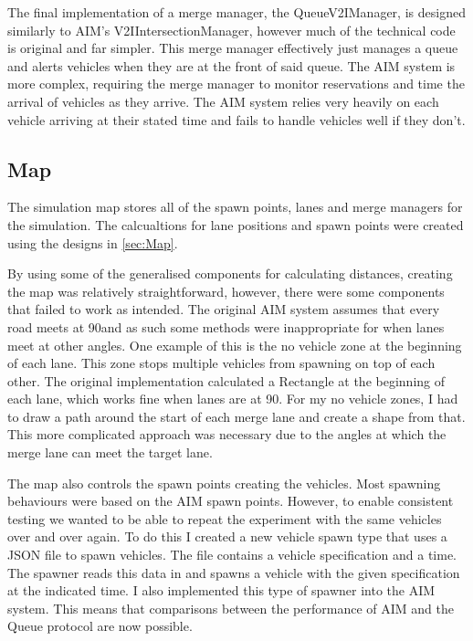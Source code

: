 The final implementation of a merge manager, the QueueV2IManager, is designed similarly to AIM's V2IIntersectionManager, however much of the technical code is original and far simpler. This merge manager effectively just manages a queue and alerts vehicles when they are at the front of said queue. The AIM system is more complex, requiring the merge manager to monitor reservations and time the arrival of vehicles as they arrive. The AIM system relies very heavily on each vehicle arriving at their stated time and fails to handle vehicles well if they don't.

\subsection{Map}
\label{subsec:Map}
The simulation map stores all of the spawn points, lanes and merge managers for the simulation. The calcualtions for lane positions and spawn points were created using the designs in \ref{sec:Map}. 

By using some of the generalised components for calculating distances, creating the map was relatively straightforward, however, there were some components that failed to work as intended. The original AIM system assumes that every road meets at 90\degree and as such some methods were inappropriate for when lanes meet at other angles. One example of this is the no vehicle zone at the beginning of each lane. This zone stops multiple vehicles from spawning on top of each other. The original implementation calculated a Rectangle at the beginning of each lane, which works fine when lanes are at 90\degree. For my no vehicle zones, I had to draw a path around the start of each merge lane and create a shape from that. This more complicated approach was necessary due to the angles at which the merge lane can meet the target lane. 

The map also controls the spawn points creating the vehicles. Most spawning behaviours were based on the AIM spawn points. However, to enable consistent testing we wanted to be able to repeat the experiment with the same vehicles over and over again. To do this I created a new vehicle spawn type that uses a JSON file to spawn vehicles. The file contains a vehicle specification and a time. The spawner reads this data in and spawns a vehicle with the given specification at the indicated time. I also implemented this type of spawner into the AIM system. This means that comparisons between the performance of AIM and the Queue protocol are now possible.

